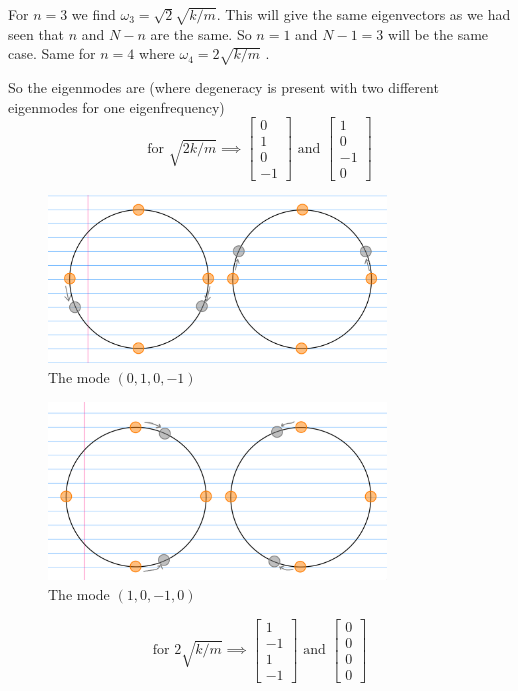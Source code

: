 \documentclass[letter, 10pts]{article}
\begin{document}
For $n = 3$ we find $\omega_3 = \sqrt{2} \sqrt{k / m} $. This will give the same eigenvectors as we had seen that $n$ and $N - n$ are the same. So $n = 1$ and $N - 1 = 3$ will be the same case. Same for $n = 4$ where $\omega_4 = 2 \sqrt{k / m}  $ .

So the eigenmodes are (where degeneracy is present with two different eigenmodes for one eigenfrequency)
\[
	\text{for }  \sqrt{2 k / m}  \implies 
\begin{bmatrix} 0 \\ 1 \\ 0 \\ -1 \end{bmatrix} 
\text{ and }
	\begin{bmatrix} 1\\ 0 \\ -1 \\ 0 \end{bmatrix} 
\]
\begin{figure}[H]
	\centering
	\includegraphics[width=0.8\textwidth]{./ss/11/2.png}
	\caption{The mode $(0,1,0,-1)$}
	\label{fig:-ss-11-2-png}
\end{figure}
\begin{figure}[H]
	\centering
	\includegraphics[width=0.8\textwidth]{./ss/11/3.png}
	\caption{The mode $(1,0,-1,0)$}
	\label{fig:-ss-11-3-png}
\end{figure}
\[
\text{for } 2\sqrt{k / m}  \implies 
	\begin{bmatrix} 1\\ -1 \\ 1 \\ -1 \end{bmatrix} \text{ and }
\begin{bmatrix} 0 \\ 0 \\ 0 \\ 0 \end{bmatrix} 
\] 
\end{document}
